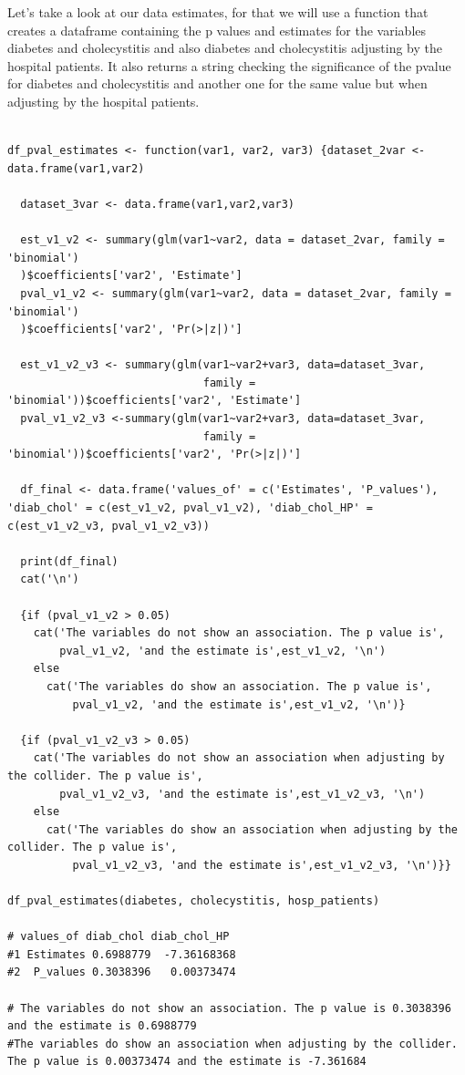 \documentclass{article}
\begin{document}
Let's take a look at our data estimates, for that we will use a function that creates a dataframe containing the p values and estimates for the variables diabetes and cholecystitis and also diabetes and cholecystitis adjusting by the hospital patients. It also returns a string checking the  significance of the pvalue for diabetes and cholecystitis and another one for the same value but when adjusting by the hospital patients.\par


\begin{lstlisting}

df_pval_estimates <- function(var1, var2, var3) {dataset_2var <- data.frame(var1,var2)

  dataset_3var <- data.frame(var1,var2,var3)
  
  est_v1_v2 <- summary(glm(var1~var2, data = dataset_2var, family = 'binomial')
  )$coefficients['var2', 'Estimate']
  pval_v1_v2 <- summary(glm(var1~var2, data = dataset_2var, family = 'binomial')
  )$coefficients['var2', 'Pr(>|z|)']
  
  est_v1_v2_v3 <- summary(glm(var1~var2+var3, data=dataset_3var, 
                              family = 'binomial'))$coefficients['var2', 'Estimate']
  pval_v1_v2_v3 <-summary(glm(var1~var2+var3, data=dataset_3var, 
                              family = 'binomial'))$coefficients['var2', 'Pr(>|z|)']
  
  df_final <- data.frame('values_of' = c('Estimates', 'P_values'), 'diab_chol' = c(est_v1_v2, pval_v1_v2), 'diab_chol_HP' = c(est_v1_v2_v3, pval_v1_v2_v3))
  
  print(df_final)
  cat('\n')
  
  {if (pval_v1_v2 > 0.05)
    cat('The variables do not show an association. The p value is', 
        pval_v1_v2, 'and the estimate is',est_v1_v2, '\n')
    else
      cat('The variables do show an association. The p value is', 
          pval_v1_v2, 'and the estimate is',est_v1_v2, '\n')}
  
  {if (pval_v1_v2_v3 > 0.05)
    cat('The variables do not show an association when adjusting by the collider. The p value is', 
        pval_v1_v2_v3, 'and the estimate is',est_v1_v2_v3, '\n')
    else
      cat('The variables do show an association when adjusting by the collider. The p value is', 
          pval_v1_v2_v3, 'and the estimate is',est_v1_v2_v3, '\n')}}

df_pval_estimates(diabetes, cholecystitis, hosp_patients)

# values_of diab_chol diab_chol_HP
#1 Estimates 0.6988779  -7.36168368
#2  P_values 0.3038396   0.00373474

# The variables do not show an association. The p value is 0.3038396 and the estimate is 0.6988779 
#The variables do show an association when adjusting by the collider. The p value is 0.00373474 and the estimate is -7.361684

\end{lstlisting}
\end{document}
